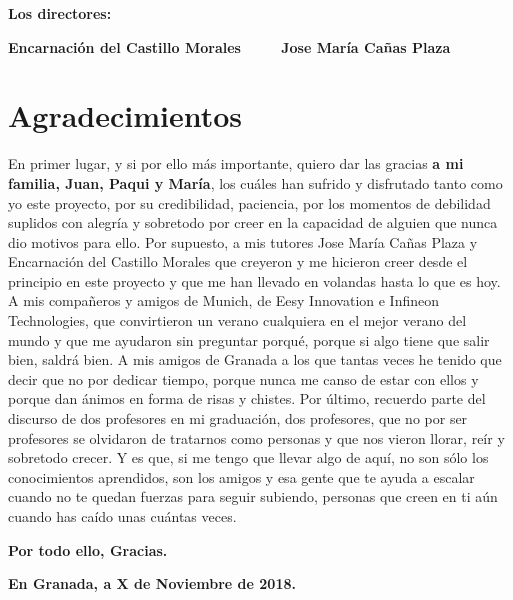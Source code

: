 \vspace{1cm}

\textbf{Los directores:}

\vspace{5cm}

\noindent \textbf{Encarnación del Castillo Morales\ \ \ \ \ Jose María Cañas Plaza}

\chapter*{Agradecimientos}
\thispagestyle{empty}

       \vspace{1cm}

En primer lugar, y si por ello más importante, quiero dar las gracias {\bf a mi familia, Juan, Paqui y María}, los cuáles han sufrido y disfrutado tanto como yo este proyecto, por su credibilidad, paciencia, por los momentos de debilidad suplidos con alegría y sobretodo por creer en la capacidad de alguien que nunca dio motivos para ello.  \newline
Por supuesto, a mis tutores Jose María Cañas Plaza y Encarnación del Castillo Morales que creyeron y me hicieron creer desde el principio en este proyecto y que me han llevado en volandas hasta lo que es hoy. \newline
A mis compañeros y amigos de Munich, de Eesy Innovation e Infineon Technologies, que convirtieron un verano cualquiera en el mejor verano del mundo y que me ayudaron sin preguntar porqué, porque si algo tiene que salir bien, saldrá bien. \newline 
A mis amigos de Granada a los que tantas veces he tenido que decir que no por dedicar tiempo, porque nunca me canso de estar con ellos y porque dan ánimos en forma de risas y chistes.\newline
Por último, recuerdo parte del discurso de dos profesores en mi graduación, dos profesores, que no por ser profesores se olvidaron de tratarnos como personas y que nos vieron llorar, reír y sobretodo crecer. Y es que, si me tengo que llevar algo de aquí, no son sólo los conocimientos aprendidos, son los amigos y esa gente que te ayuda a escalar cuando no te quedan fuerzas para seguir subiendo, personas que creen en ti aún cuando has caído unas cuántas veces.

{\bf Por todo ello, Gracias.}

\vspace{1cm}

{\bf En Granada, a X de Noviembre de 2018.}

